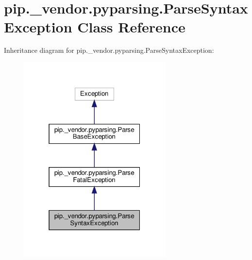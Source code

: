 \hypertarget{classpip_1_1__vendor_1_1pyparsing_1_1ParseSyntaxException}{}\section{pip.\+\_\+vendor.\+pyparsing.\+Parse\+Syntax\+Exception Class Reference}
\label{classpip_1_1__vendor_1_1pyparsing_1_1ParseSyntaxException}


Inheritance diagram for pip.\+\_\+vendor.\+pyparsing.\+Parse\+Syntax\+Exception\+:
\nopagebreak
\begin{figure}[H]
\begin{center}
\leavevmode
\includegraphics[width=220pt]{classpip_1_1__vendor_1_1pyparsing_1_1ParseSyntaxException__inherit__graph}
\end{center}
\end{figure}


